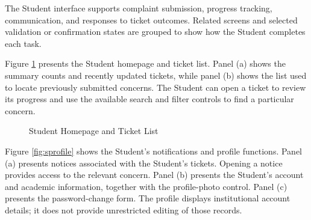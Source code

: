 The Student interface supports complaint submission, progress tracking, communication, and responses to ticket outcomes. Related screens and selected validation or confirmation states are grouped to show how the Student completes each task.

Figure \ref{fig:shome} presents the Student homepage and ticket list. Panel (a) shows the summary counts and recently updated tickets, while panel (b) shows the list used to locate previously submitted concerns. The Student can open a ticket to review its progress and use the available search and filter controls to find a particular concern.

\renewcommand{\thefigure}{5.5}
\begin{figure}[htbp]
    \centering
    \begin{minipage}[t]{0.43\linewidth}
        \centering
        \vspace{0pt}
        \par{}\par
    \end{minipage}\hspace{0.04\linewidth}
    \begin{minipage}[t]{0.43\linewidth}
        \centering
        \vspace{0pt}
        \par{}\par
    \end{minipage}
    \caption{Student Homepage and Ticket List}
    \label{fig:shome}
\end{figure}
\FloatBarrier

Figure \ref{fig:sprofile} shows the Student's notifications and profile functions. Panel (a) presents notices associated with the Student's tickets. Opening a notice provides access to the relevant concern. Panel (b) presents the Student's account and academic information, together with the profile-photo control. Panel (c) presents the password-change form. The profile displays institutional account details; it does not provide unrestricted editing of those records.

